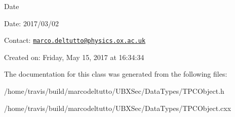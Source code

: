 \begin{DoxyDate}{\-Date}

\end{DoxyDate}
\begin{DoxyParagraph}{\-Date\-:}
2017/03/02 
\end{DoxyParagraph}


\-Contact\-: \href{mailto:marco.deltutto@physics.ox.ac.uk}{\tt marco.\-deltutto@physics.\-ox.\-ac.\-uk}

\-Created on\-: \-Friday, \-May 15, 2017 at 16\-:34\-:34 

\-The documentation for this class was generated from the following files\-:\begin{DoxyCompactItemize}
\item 
/home/travis/build/marcodeltutto/\-U\-B\-X\-Sec/\-Data\-Types/\-T\-P\-C\-Object.\-h\item 
/home/travis/build/marcodeltutto/\-U\-B\-X\-Sec/\-Data\-Types/\-T\-P\-C\-Object.\-cxx\end{DoxyCompactItemize}
